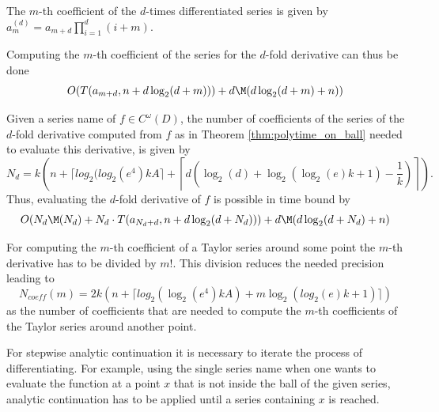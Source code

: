 		\begin{theorem}
			The $m$-th coefficient of the $d$-times differentiated series is given by $a_m^{(d)} = a_{m+d} \prod_{i=1}^d (i+m)$.
			
			Computing the $m$-th coefficient of the series for the $d$-fold derivative can thus be done
			$$ O(T(a_{m+d}, n+d\log_2(d+m)))+d\M(d \log_2 (d+m)+n)) $$
		\end{theorem}

		\begin{theorem}
			Given a series name of $f \in C^\omega(D)$, the number of coefficients of the series of the $d$-fold derivative computed from $f$ as in Theorem \ref{thm:polytime_on_ball} needed to evaluate this derivative, is given by 
			$$N_d = k\left(n+\lceil log_2(log_2 (e^4) kA \rceil+\left \lceil d\left(\log_2(d)+\log_2(\log_2(e)k+1)-\frac{1}{k}\right)\right\rceil\right).$$
			Thus, evaluating the $d$-fold derivative of $f$ is possible in time bound by
			$$ O(N_d\M(N_d)+N_d \cdot T(a_{N_d+d}, n+d\log_2(d+N_d)))+d\M(d \log_2 (d+N_d)+n) $$ 
		\end{theorem}
		For computing the $m$-th coefficient of a Taylor series around some point the $m$-th derivative 
		has to be divided by $m!$. This division reduces the needed precision leading to 
		$$N_{coeff}(m) = 2k\left( n+\lceil log_2(\log_2 (e^4) kA) + m \log_2(log_2(e)k+1)\rceil \right)$$
		as the number of coefficients that are needed to compute the $m$-th coefficients of the Taylor series 
		around another point. 
    
		For stepwise analytic continuation it is necessary to iterate the process of differentiating.
		For example, using the single series name when one wants to evaluate the function at a point $x$
		that is not inside the ball of the given series, analytic continuation has to be applied until a series
		containing $x$ is reached.

